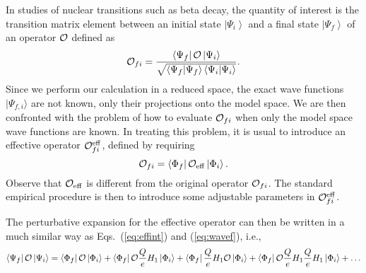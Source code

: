 In studies of nuclear transitions such as beta decay, the quantity of
interest is the transition matrix element between an initial state
$\left|\Psi_i\right\rangle$ and a final state $\left|\Psi_f\right\rangle$
of an operator ${\cal O}$ defined as
\begin{equation}
  {\cal O}_{fi}=
  \frac{\left\langle\Psi_f\right|
    {\cal O}\left|\Psi_i\right\rangle }
  {\sqrt{\left\langle\Psi_f | \Psi_f \right\rangle
      \left\langle \Psi_i | \Psi_i \right\rangle}}.
  \label{eq:effop1}
\end{equation}
Since we perform our calculation in a reduced space, the exact
wave functions $|\Psi_{f,i}\rangle$ are not known, only their
projections onto the model space. We are then confronted with the
problem of how to evaluate ${\cal O}_{fi}$ when only the model
space wave functions are known. In treating this problem, it is usual
to introduce an effective operator
${\cal O}_{fi}^{\mathrm{eff}}$, defined by requiring
\begin{equation}
  {\cal O}_{fi}=\left\langle\Phi_f\right |{\cal O}_{\mathrm{eff}}
  \left|\Phi_i\right\rangle.
\end{equation}
Observe that ${\cal O}_{\mathrm{eff}}$
is different from the original operator ${\cal O}_{fi}$. The standard
empirical procedure is then to introduce some adjustable parameters
in ${\cal O}_{fi}^{\mathrm{eff}}$. 

The perturbative expansion for the effective operator can then
be written in a much similar way as Eqs.\ (\ref{eq:effint}) and
(\ref{eq:wavef}), i.e.,  
\begin{equation}
  \left\langle\Psi_{f}\right|{\cal O}\left|\Psi_{i}\right\rangle=
  \left\langle\Phi_{f}\right|{\cal O}\left|\Phi_{i}\right\rangle+
  \left\langle\Phi_{f}\right|{\cal O}\frac{Q}{e}H_1\left|\Phi_{i}\right\rangle+
  \left\langle\Phi_{f}\right|\frac{Q}{e}H_1{\cal O}\left|\Phi_{i}\right\rangle+
  \left\langle\Phi_{f}\right|{\cal O}\frac{Q}{e}H_1\frac{Q}{e}H_1\left|\Phi_{i}
  \right\rangle+\dots
  \label{eq:effoperexp}
\end{equation}

